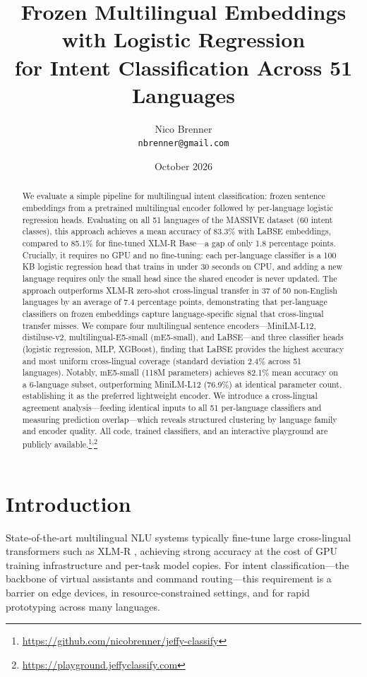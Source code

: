 \documentclass[11pt]{article}
\title{Frozen Multilingual Embeddings with Logistic Regression\\for Intent Classification Across 51 Languages}
\author{Nico Brenner \\
\texttt{nbrenner@gmail.com}}
\date{October 2026}
\begin{document}
\maketitle

\begin{abstract}
We evaluate a simple pipeline for multilingual intent classification: frozen sentence embeddings from a pretrained multilingual encoder followed by per-language logistic regression heads. Evaluating on all 51 languages of the MASSIVE dataset (60 intent classes), this approach achieves a mean accuracy of 83.3\% with LaBSE embeddings, compared to 85.1\% for fine-tuned XLM-R Base---a gap of only 1.8 percentage points. Crucially, it requires no GPU and no fine-tuning: each per-language classifier is a 100\,KB logistic regression head that trains in under 30 seconds on CPU, and adding a new language requires only the small head since the shared encoder is never updated. The approach outperforms XLM-R zero-shot cross-lingual transfer in 37 of 50 non-English languages by an average of 7.4 percentage points, demonstrating that per-language classifiers on frozen embeddings capture language-specific signal that cross-lingual transfer misses. We compare four multilingual sentence encoders---MiniLM-L12, distiluse-v2, multilingual-E5-small (mE5-small), and LaBSE---and three classifier heads (logistic regression, MLP, XGBoost), finding that LaBSE provides the highest accuracy and most uniform cross-lingual coverage (standard deviation 2.4\% across 51 languages). Notably, mE5-small (118M parameters) achieves 82.1\% mean accuracy on a 6-language subset, outperforming MiniLM-L12 (76.9\%) at identical parameter count, establishing it as the preferred lightweight encoder. We introduce a cross-lingual agreement analysis---feeding identical inputs to all 51 per-language classifiers and measuring prediction overlap---which reveals structured clustering by language family and encoder quality. All code, trained classifiers, and an interactive playground are publicly available.\footnote{\url{https://github.com/nicobrenner/jeffy-classify}}\textsuperscript{,}\footnote{\url{https://playground.jeffyclassify.com}}
\end{abstract}


\section{Introduction}

State-of-the-art multilingual NLU systems typically fine-tune large cross-lingual transformers such as XLM-R \citep{conneau2020xlmr}, achieving strong accuracy at the cost of GPU training infrastructure and per-task model copies. For intent classification---the backbone of virtual assistants and command routing---this requirement is a barrier on edge devices, in resource-constrained settings, and for rapid prototyping across many languages.
\end{document}
